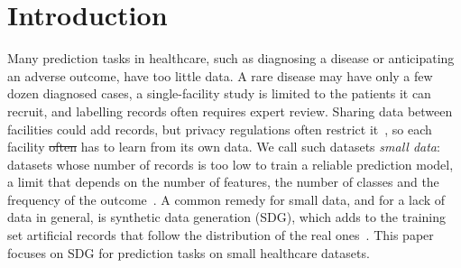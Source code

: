 \documentclass[conference]{IEEEtran}
\providecommand{\DIFaddtex}[1]{{\protect\color{blue}\uwave{#1}}} %
\providecommand{\DIFdeltex}[1]{{\protect\color{red}\sout{#1}}}                      %
\providecommand{\DIFaddbegin}{} %
\providecommand{\DIFaddend}{} %
\providecommand{\DIFdelbegin}{} %
\providecommand{\DIFdelend}{} %
\providecommand{\DIFadd}[1]{\texorpdfstring{\DIFaddtex{#1}}{#1}} %
\providecommand{\DIFdel}[1]{\texorpdfstring{\DIFdeltex{#1}}{}} %
\newcommand{\DIFscaledelfig}{0.5}
\newlength{\DIFdelgraphicswidth} %
\newlength{\DIFdelgraphicsheight} %
\newcommand{\DIFaddincludegraphics}[2][]{{\color{blue}\fbox{\DIFOincludegraphics[#1]{#2}}}} %
\newcommand{\DIFdelincludegraphics}[2][]{%
\sbox{\DIFdelgraphicsbox}{\DIFOincludegraphics[#1]{#2}}%
\settoboxwidth{\DIFdelgraphicswidth}{\DIFdelgraphicsbox} %
\settoboxtotalheight{\DIFdelgraphicsheight}{\DIFdelgraphicsbox} %
\scalebox{\DIFscaledelfig}{%
\parbox[b]{\DIFdelgraphicswidth}{\usebox{\DIFdelgraphicsbox}\\[-\baselineskip] \rule{\DIFdelgraphicswidth}{0em}}\llap{\resizebox{\DIFdelgraphicswidth}{\DIFdelgraphicsheight}{%
\setlength{\unitlength}{\DIFdelgraphicswidth}%
\begin{picture}(1,1)%
\thicklines\linethickness{2pt} %
{\color[rgb]{1,0,0}\put(0,0){\framebox(1,1){}}}%
{\color[rgb]{1,0,0}\put(0,0){\line( 1,1){1}}}%
{\color[rgb]{1,0,0}\put(0,1){\line(1,-1){1}}}%
\end{picture}%
}\hspace*{3pt}}} %
} %
\DeclareRobustCommand{\DIFaddbegin}{\DIFOaddbegin \let\includegraphics\DIFaddincludegraphics} %
\DeclareRobustCommand{\DIFaddend}{\DIFOaddend \let\includegraphics\DIFOincludegraphics} %
\DeclareRobustCommand{\DIFdelbegin}{\DIFOdelbegin \let\includegraphics\DIFdelincludegraphics} %
\DeclareRobustCommand{\DIFdelend}{\DIFOaddend \let\includegraphics\DIFOincludegraphics} %
\begin{document}
\section{Introduction}
\label{sec:intro}
Many prediction tasks in healthcare, such as diagnosing a disease or anticipating an adverse outcome, have too little data. A rare disease may have only a few dozen diagnosed cases, a single-facility study is limited to the patients it can recruit, and labelling records often requires expert review. Sharing data between facilities could add records, but privacy regulations often restrict it~\cite{rieke2020digitalhealth}, so each facility \DIFdelbegin \DIFdel{often }\DIFdelend \DIFaddbegin \DIFadd{usually }\DIFaddend has to learn from its own data. We call such datasets \emph{small data}: datasets whose number of records is too low to train a reliable prediction model, a limit that depends on the number of features, the number of classes and the frequency of the outcome~\cite{riley2019binary}. A common remedy for small data, and for a lack of data in general, is synthetic data generation (SDG), which adds to the training set artificial records that follow the distribution of the real ones~\cite{qian2023synthcity}. This paper focuses on SDG for prediction tasks on small healthcare datasets.
\end{document}
